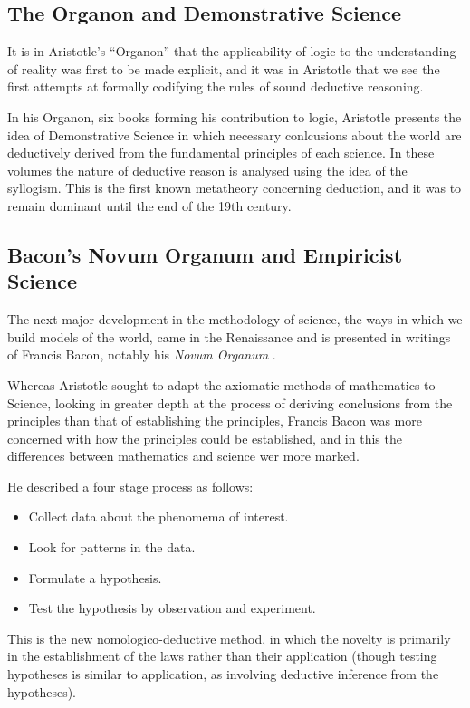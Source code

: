 \documentclass[10pt,titlepage]{book}
\begin{document}
\subsection{The Organon and Demonstrative Science}

It is in Aristotle's ``Organon'' \cite{aristotleL325,aristotleL391} that the applicability of logic to the understanding of reality was first to be made explicit, and it was in Aristotle that we see the first attempts at formally codifying the rules of sound deductive reasoning.

In his Organon, six books forming his contribution to logic, Aristotle presents the idea of Demonstrative Science in which necessary conlcusions about the world are deductively derived from the fundamental principles of each science.
In these volumes the nature of deductive reason is analysed using the idea of the syllogism.
This is the first known metatheory concerning deduction, and it was to remain dominant until the end of the 19th century.

\subsection{Bacon's Novum Organum and Empiricist Science}

The next major development in the methodology of science, the ways in which we build models of the world, came in the Renaissance and is presented in writings of Francis Bacon, notably his \emph{Novum Organum} \cite{bacon2017novum}.

Whereas Aristotle sought to adapt the axiomatic methods of mathematics to Science, looking in greater depth at the process of deriving conclusions from the principles than that of establishing the principles, Francis Bacon was more concerned with how the principles could be established, and in this the differences between mathematics and science wer more marked.

He described a four stage process as follows:

\begin{itemize}
\item Collect data about the phenomema of interest.
\item Look for patterns in the data.
\item Formulate a hypothesis.
\item Test the hypothesis by observation and experiment.
\end{itemize}

This is the new nomologico-deductive method, in which the novelty is primarily in the establishment of the laws rather than their application (though testing hypotheses is similar to application, as involving deductive inference from the hypotheses).
\end{document}
